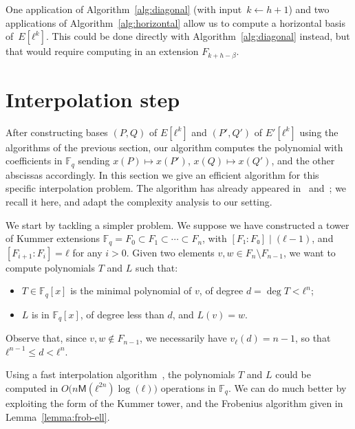 \documentclass{lms}
\def\cout#1{\mathsf{#1}}
\newcommand{\F}{\mathbb{F}}
\newcommand{\MM}{\cout{M}}
\begin{document}
One application of Algorithm~\ref{alg:diagonal} (with input~$k ← h+1$)
and two applications of Algorithm~\ref{alg:horizontal} allow us
to compute a horizontal basis of~$E[ℓ^k]$.
This could be done directly with Algorithm~\ref{alg:diagonal} instead,
but that would require computing in an extension $F_{k+h-\beta}$.



\section{Interpolation step}
\label{sec:interpolation}

After constructing bases $(P,Q)$ of $E[ℓ^k]$ and $(P',Q')$ of
$E'[ℓ^k]$ using the algorithms of the previous section, our algorithm
computes the polynomial with coefficients in $\F_q$ sending
$x(P)↦x(P')$, $x(Q)↦x(Q')$, and the other abscissas accordingly.  In
this section we give an efficient algorithm for this specific
interpolation problem. The algorithm has already appeared
in~\cite{df10} and~\cite{enge+morain03}; we recall it here, and adapt
the complexity analysis to our setting.


We start by tackling a simpler problem. We suppose we have constructed
a tower of Kummer extensions $\F_q=F_0⊂F_1⊂\cdots⊂F_n$, with
$[F₁:F₀]\mid(ℓ-1)$, and $[F_{i+1}:F_i]=ℓ$ for any $i>0$. Given two
elements $v,w∈F_n\setminus F_{n-1}$, we want to compute polynomials
$T$ and $L$ such that:
\begin{itemize}
\item $T \in \F_q[x]$ is the minimal polynomial of $v$, of degree
  $d=\deg T<ℓ^n$;
\item $L$ is in $\F_q[x]$, of degree less than $d$, and $L(v)=w$.
\end{itemize}
Observe that, since $v,w∉F_{n-1}$, we necessarily have $v_ℓ(d)=n-1$,
so that $ℓ^{n-1}≤d<ℓ^n$.

Using a fast interpolation algorithm~\cite[Chapter~10.2]{vzGG}, the
polynomials $T$ and $L$ could be computed in
$O\bigl(n\MM(ℓ^{2n})\log(ℓ)\bigr)$ operations in $\F_q$. We can do
much better by exploiting the form of the Kummer tower, and the
Frobenius algorithm given in Lemma~\ref{lemma:frob-ell}.
\end{document}
